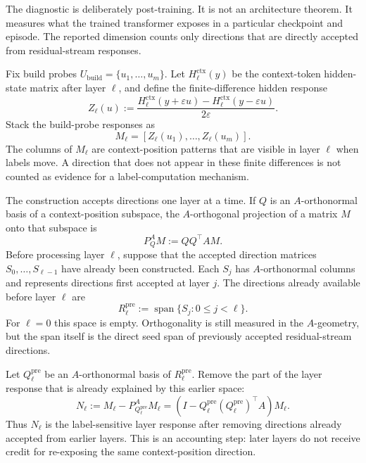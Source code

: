 \documentclass[11pt]{article}
\newcommand{\spanop}{\operatorname{span}}
\begin{document}
The diagnostic is deliberately post-training. It is not an architecture theorem. It measures what
the trained transformer exposes in a particular checkpoint and episode. The reported dimension
counts only directions that are directly accepted from residual-stream responses.

Fix build probes \(U_{\mathrm{build}}=\{u_1,\ldots,u_m\}\). Let
\(H_\ell^{\mathrm{ctx}}(y)\) be the context-token hidden-state matrix after layer \(\ell\), and define
the finite-difference hidden response
\[
Z_\ell(u):=
\frac{
H_\ell^{\mathrm{ctx}}(y+\varepsilon u)-H_\ell^{\mathrm{ctx}}(y-\varepsilon u)
}{2\varepsilon}.
\]
Stack the build-probe responses as
\[
M_\ell=[Z_\ell(u_1),\ldots,Z_\ell(u_m)].
\]
The columns of \(M_\ell\) are context-position patterns that are visible in layer \(\ell\) when labels
move. A direction that does not appear in these finite differences is not counted as evidence for a
label-computation mechanism.

The construction accepts directions one layer at a time. If \(Q\) is an \(A\)-orthonormal basis of a
context-position subspace, the \(A\)-orthogonal projection of a matrix \(M\) onto that subspace is
\[
P_Q^A M := QQ^\top AM.
\]
Before processing layer \(\ell\), suppose that the accepted direction matrices \(S_0,\ldots,S_{\ell-1}\)
have already been constructed. Each \(S_j\) has \(A\)-orthonormal columns and represents directions
first accepted at layer \(j\). The directions already available before layer \(\ell\) are
\[
R_\ell^{\mathrm{pre}}
:=
\spanop\{S_j:0\le j<\ell\}.
\]
For \(\ell=0\) this space is empty. Orthogonality is still measured in the \(A\)-geometry, but the
span itself is the direct seed span of previously accepted residual-stream directions.

Let \(Q_\ell^{\mathrm{pre}}\) be an \(A\)-orthonormal basis of \(R_\ell^{\mathrm{pre}}\). Remove the part of the
layer response that is already explained by this earlier space:
\[
N_\ell
:=
M_\ell-P_{Q_\ell^{\mathrm{pre}}}^AM_\ell
=
\left(I-Q_\ell^{\mathrm{pre}}(Q_\ell^{\mathrm{pre}})^\top A\right)M_\ell.
\]
Thus \(N_\ell\) is the label-sensitive layer response after removing directions already accepted
from earlier layers. This is an accounting step: later layers do not receive credit for re-exposing
the same context-position direction.
\end{document}
